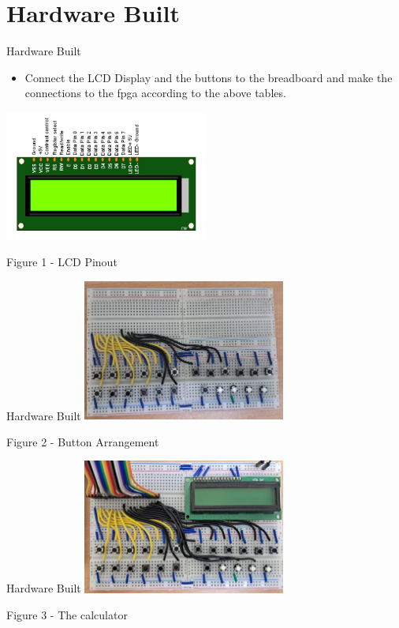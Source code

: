 \documentclass{beamer}
\theoremstyle{remark}
\begin{document}
\section{Hardware Built}
\begin{frame}{Hardware Built}
    \begin{itemize}
    \item Connect the LCD Display and the buttons to the breadboard and make the connections to the fpga according to the above tables.
\end{itemize}
\centering
\includegraphics[width=0.5\textwidth]{figs/lcd.png}
\centerline{Figure 1 -  LCD Pinout}
\end{frame}
\begin{frame}{Hardware Built}
\centering
    \includegraphics[width=0.5\textwidth]{figs/buttons.jpeg}
\centerline{Figure 2 -  Button Arrangement}
\end{frame}
\begin{frame}{Hardware Built}
\centering
    \includegraphics[width=0.5\textwidth]{figs/final.jpeg}
\centerline{Figure 3 -  The calculator}
\end{frame}
\end{document}
